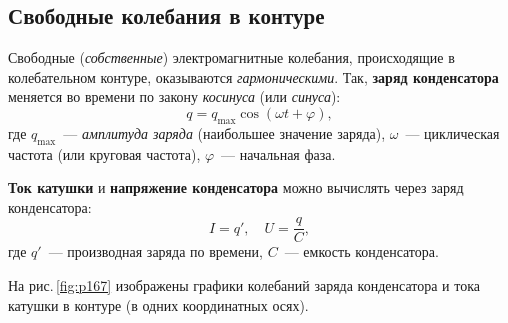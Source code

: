 \documentclass[main.tex]{subfiles}
\begin{document}

\pagestyle{empty}

\begin{NoHyper} %

\setcounter{section}{43
}
\addtocounter{section}{-1} 

\section{Свободные колебания в контуре}


Свободные (\emph{собственные}) электромагнитные колебания, происходящие в колебательном контуре, оказываются \emph{гармоническими}. Так, \textbf{заряд конденсатора} меняется во времени по закону \emph{косинуса} (или \emph{синуса}):
\begin{equation}
    q=q_\text{max}\cos(\omega t + \varphi),
\end{equation}
где $q_\text{max}$~--- \emph{амплитуда заряда} (наибольшее значение заряда), $\omega$~--- циклическая частота (или круговая частота),
$\varphi$~--- начальная фаза.

\textbf{Ток катушки} и \textbf{напряжение конденсатора} можно вычислять через заряд конденсатора:
\begin{equation}
    I=q',\quad U=\frac{q}{C},
\end{equation}
где $q'$~--- производная заряда по времени, $C$~--- емкость конденсатора.

На рис.\,\ref{fig:p167} изображены графики колебаний заряда конденсатора и тока катушки в контуре (в одних координатных осях).

\begin{figure}[H]
    \centering

\end{figure}
\end{NoHyper}
\end{document}
